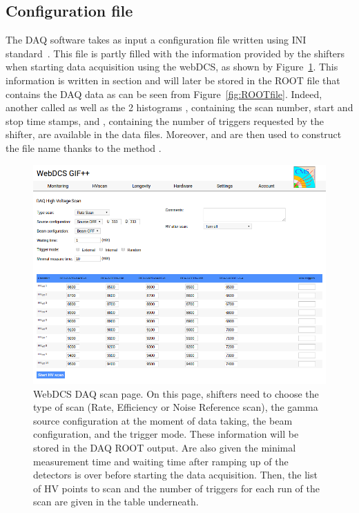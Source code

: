     \subsection{Configuration file}
    \label{app1:ssec:inifile}
    
    The DAQ software takes as input a configuration file written using INI standard~\cite{INI}. This file is partly filled with the information provided by the shifters when starting data acquisition using the webDCS, as shown by Figure~\ref{fig:scaninfo}. This information is written in section \iniinline{[General]} and will later be stored in the ROOT file that contains the DAQ data as can be seen from Figure~\ref{fig:ROOTfile}. Indeed, another  called  as well as the 2 histograms , containing the scan number, start and stop time stamps, and , containing the number of triggers requested by the shifter, are available in the data files. Moreover,  and  are then used to construct the file name thanks to the method .
    
    \begin{figure}[H]
		\centering
		\includegraphics[width = \plotwidth]{fig/app1/webDCS-scan-information.png}
		\caption{\label{fig:scaninfo} WebDCS DAQ scan page. On this page, shifters need to choose the type of scan (Rate, Efficiency or Noise Reference scan), the gamma source configuration at the moment of data taking, the beam configuration, and the trigger mode. These information will be stored in the DAQ ROOT output. Are also given the minimal measurement time and waiting time after ramping up of the detectors is over before starting the data acquisition. Then, the list of HV points to scan and the number of triggers for each run of the scan are given in the table underneath.}
	\end{figure}
	
